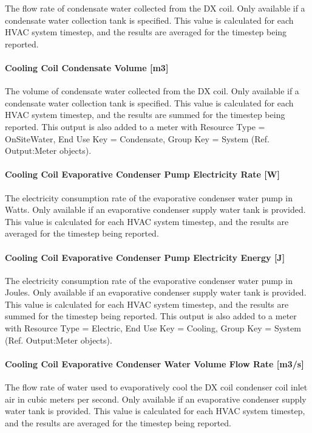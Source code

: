 The flow rate of condensate water collected from the DX coil. Only available if a condensate water collection tank is specified. This value is calculated for each HVAC system timestep, and the results are averaged for the timestep being reported.

\paragraph{Cooling Coil Condensate Volume {[}m3{]}}

The volume of condensate water collected from the DX coil. Only available if a condensate water collection tank is specified. This value is calculated for each HVAC system timestep, and the results are summed for the timestep being reported. This output is also added to a meter with Resource Type = OnSiteWater, End Use Key = Condensate, Group Key = System (Ref. Output:Meter objects).

\paragraph{Cooling Coil Evaporative Condenser Pump Electricity Rate {[}W{]}}

The electricity consumption rate of the evaporative condenser water pump in Watts. Only available if an evaporative condenser supply water tank is provided. This value is calculated for each HVAC system timestep, and the results are averaged for the timestep being reported.

\paragraph{Cooling Coil Evaporative Condenser Pump Electricity Energy {[}J{]}}

The electricity consumption rate of the evaporative condenser water pump in Joules. Only available if an evaporative condenser supply water tank is provided. This value is calculated for each HVAC system timestep, and the results are summed for the timestep being reported. This output is also added to a meter with Resource Type = Electric, End Use Key = Cooling, Group Key = System (Ref. Output:Meter objects).

\paragraph{Cooling Coil Evaporative Condenser Water Volume Flow Rate {[}m3/s{]}}

The flow rate of water used to evaporatively cool the DX coil condenser coil inlet air in cubic meters per second. Only available if an evaporative condenser supply water tank is provided. This value is calculated for each HVAC system timestep, and the results are averaged for the timestep being reported.

